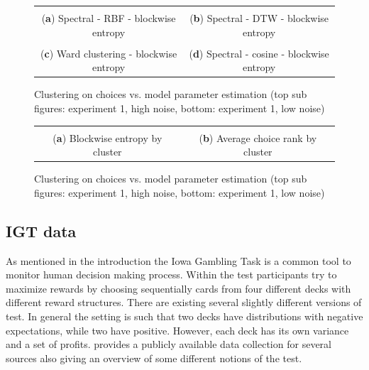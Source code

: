 \documentclass[12pt,a4paper,bibliography=totocnumbered,listof=totocnumbered]{scrartcl}
\begin{document}
\begin{figure}[H]
	\centering
	\small
	\hspace*{-0.7in}
	\begin{tabular}{cc}
		 &  \\
		(\textbf{a}) Spectral - RBF - blockwise entropy & (\textbf{b}) Spectral - DTW - blockwise entropy \\
			 &  \\
			(\textbf{c}) Ward clustering - blockwise entropy & (\textbf{d}) Spectral - cosine - blockwise entropy
	\end{tabular} \quad
	\caption{Clustering on choices vs. model parameter estimation (top sub figures: experiment 1, high noise, bottom: experiment 1, low noise)}
	\label{fig:cluse1c2}
\end{figure}

\begin{figure}[H]
	\centering
	\small
	\hspace*{-0.7in}
	\begin{tabular}{cc}
		 &  \\
		(\textbf{a}) Blockwise entropy by cluster & (\textbf{b}) Average choice rank by cluster \\
	\end{tabular} \quad
	\caption{Clustering on choices vs. model parameter estimation (top sub figures: experiment 1, high noise, bottom: experiment 1, low noise)}
	\label{fig:cluse1c3}
\end{figure}

\subsection{IGT data}

As mentioned in the introduction the Iowa Gambling Task is a common tool to monitor human decision making process. Within the test participants try to maximize rewards by choosing sequentially cards from four different decks with different reward structures. There are existing several slightly different versions of test. In general the setting is such that two decks have distributions with negative expectations, while two have positive. However, each deck has its own variance and a set of profits. \cite{Steingroever2015} provides a publicly available data collection for several sources also giving an overview of some different notions of the test.
\end{document}

